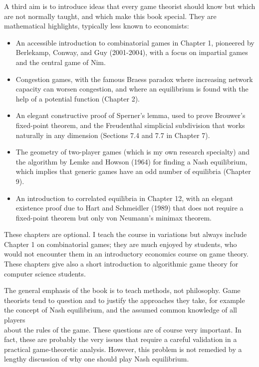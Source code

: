 \documentclass[12pt]{article}
\begin{document}
A third aim is to introduce ideas that every game theorist should know but which are not normally taught, and which make this book special. They are mathematical highlights, typically less known to economists:

\begin{itemize}
  \item An accessible introduction to combinatorial games in Chapter 1, pioneered by Berlekamp, Conway, and Guy (2001-2004), with a focus on impartial games and the central game of Nim.
  \item Congestion games, with the famous Braess paradox where increasing network capacity can worsen congestion, and where an equilibrium is found with the help of a potential function (Chapter 2).
  \item An elegant constructive proof of Sperner's lemma, used to prove Brouwer's fixed-point theorem, and the Freudenthal simplicial subdivision that works naturally in any dimension (Sections 7.4 and 7.7 in Chapter 7).
  \item The geometry of two-player games (which is my own research specialty) and the algorithm by Lemke and Howson (1964) for finding a Nash equilibrium, which implies that generic games have an odd number of equilibria (Chapter 9).
  \item An introduction to correlated equilibria in Chapter 12, with an elegant existence proof due to Hart and Schmeidler (1989) that does not require a fixed-point theorem but only von Neumann's minimax theorem.
\end{itemize}

These chapters are optional. I teach the course in variations but always include Chapter 1 on combinatorial games; they are much enjoyed by students, who would not encounter them in an introductory economics course on game theory. These chapters give also a short introduction to algorithmic game theory for computer science students.

The general emphasis of the book is to teach methods, not philosophy. Game theorists tend to question and to justify the approaches they take, for example the concept of Nash equilibrium, and the assumed common knowledge of all players\\
about the rules of the game. These questions are of course very important. In fact, these are probably the very issues that require a careful validation in a practical game-theoretic analysis. However, this problem is not remedied by a lengthy discussion of why one should play Nash equilibrium.
\end{document}
